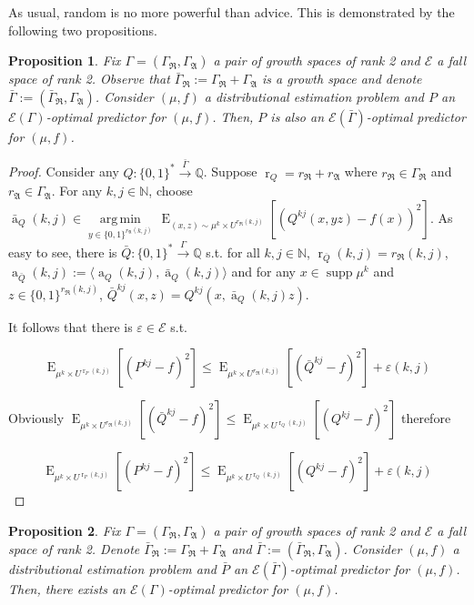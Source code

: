 \documentclass{article}
\numberwithin{equation}{section}
\theoremstyle{definition}
\theoremstyle{plain}
\newtheorem{proposition}{Proposition}[section]
\newcommand{\Words}{{\{ 0, 1 \}^*}}
\newcommand{\WordsLen}[1]{{\{ 0, 1 \}^{#1}}}
\DeclareMathOperator{\Supp}{supp}
\DeclareMathOperator{\E}{E}
\DeclareMathOperator{\R}{r}
\DeclareMathOperator{\A}{a}
\newcommand{\Argmin}[1]{\underset{#1}{\operatorname{arg\,min}}\,}
\newcommand{\Nats}{\mathbb{N}}
\newcommand{\Rats}{\mathbb{Q}}
\newcommand{\Chev}[1]{\langle #1 \rangle}
\begin{document}
As usual, random is no more powerful than advice. This is demonstrated by the following two propositions.

\begin{proposition}

Fix $\Gamma=(\Gamma_{\mathfrak{R}},\Gamma_{\mathfrak{A}})$ a pair of growth spaces of rank 2 and $\mathcal{E}$ a fall space of rank 2. Observe that $\bar{\Gamma}_{\mathfrak{R}}:=\Gamma_{\mathfrak{R}}+\Gamma_{\mathfrak{A}}$ is a growth space and denote $\bar{\Gamma}:=(\bar{\Gamma}_{\mathfrak{R}},\Gamma_{\mathfrak{A}})$. Consider $(\mu,f)$ a distributional estimation problem and $P$ an $\mathcal{E}(\Gamma)$-optimal predictor for $(\mu,f)$. Then, $P$ is also an $\mathcal{E}(\bar{\Gamma})$-optimal predictor for $(\mu,f)$.

\end{proposition}

\begin{proof}

Consider any $Q: \Words \xrightarrow{\bar{\Gamma}} \Rats$. Suppose $\R_Q=r_{\mathfrak{R}}+r_{\mathfrak{A}}$ where $r_{\mathfrak{R}} \in \Gamma_{\mathfrak{R}}$ and $r_{\mathfrak{A}} \in \Gamma_{\mathfrak{A}}$. For any $k,j \in \Nats$, choose ${\bar{\A}_Q(k,j) \in \Argmin{y \in \WordsLen{r_{\mathfrak{A}}(k,j)}} \E_{(x,z) \sim \mu^k \times U^{r_{\mathfrak{R}}(k,j)}}[(Q^{kj}(x,yz) - f(x))^2]}$. As easy to see, there is $\bar{Q}: \Words \xrightarrow{\Gamma} \Rats$ s.t. for all $k,j \in \Nats$, $\R_{\bar{Q}}(k,j) = r_{\mathfrak{R}}(k,j)$, $\A_{\bar{Q}}(k,j):=\Chev{\A_Q(k,j),\bar{\A}_Q(k,j)}$ and for any $x \in \Supp \mu^k$ and $z \in \WordsLen{r_{\mathfrak{R}}(k,j)}$, ${\bar{Q}^{kj}(x,z)=Q^{kj}(x,\bar{\A}_Q(k,j)z)}$.

It follows that there is $\varepsilon \in \mathcal{E}$ s.t.

$$\E_{\mu^k \times U^{\R_P(k,j)}}[(P^{kj} - f)^2] \leq \E_{\mu^k \times U^{r_{\mathfrak{R}}(k,j)}}[(\bar{Q}^{kj} - f)^2] + \varepsilon(k,j)$$

Obviously $\E_{\mu^k \times U^{r_{\mathfrak{R}}(k,j)}}[(\bar{Q}^{kj} - f)^2] \leq \E_{\mu^k \times U^{\R_Q(k,j)}}[(Q^{kj} - f)^2]$ therefore

$$\E_{\mu^k \times U^{\R_P(k,j)}}[(P^{kj} - f)^2] \leq \E_{\mu^k \times U^{\R_Q(k,j)}}[(Q^{kj} - f)^2] + \varepsilon(k,j)$$

\end{proof}

\begin{proposition}

Fix $\Gamma=(\Gamma_{\mathfrak{R}},\Gamma_{\mathfrak{A}})$ a pair of growth spaces of rank 2 and $\mathcal{E}$ a fall space of rank 2. Denote $\bar{\Gamma}_{\mathfrak{R}}:=\Gamma_{\mathfrak{R}}+\Gamma_{\mathfrak{A}}$ and $\bar{\Gamma}:=(\bar{\Gamma}_{\mathfrak{R}},\Gamma_{\mathfrak{A}})$. Consider $(\mu,f)$ a distributional estimation problem and $\bar{P}$ an $\mathcal{E}(\bar{\Gamma})$-optimal predictor for $(\mu,f)$. Then, there exists an $\mathcal{E}(\Gamma)$-optimal predictor for $(\mu,f)$.

\end{proposition}
\end{document}
